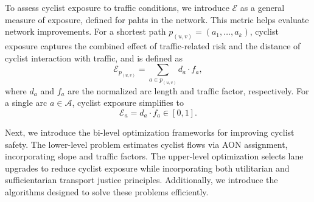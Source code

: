 \documentclass[letterpaper, 10 pt, conference]{ieeeconf}  %
\newcommand{\CRD}{$\text{C}_{\text{R}} \text{D }$}
\begin{document}
To assess cyclist exposure to traffic conditions, we introduce $\mathcal{E}$ as a general measure of exposure, defined for pahts in the network. This metric helps evaluate network improvements. For a shortest path $p_{(u,v)} = (a_1, \dots, a_k)$, cyclist exposure captures the combined effect of traffic-related risk and the distance of cyclist interaction with traffic, and is defined as
\begin{equation}
\label{exposure_def}
    \mathcal{E}_{p_{(u,v)}} = \sum_{a \in p_{(u,v)}} d_{a} \cdot f_{a},
\end{equation}
where $d_{a}$ and $f_{a}$ are the normalized arc length and traffic factor, respectively. For a single arc $a \in \mathcal{A}$, cyclist exposure simplifies to
\begin{equation}
\label{arc_exposure}
    \mathcal{E}_{a} = d_{a} \cdot f_{a} \in  \left [ 0,1 \right ].
\end{equation}

Next, we introduce the bi-level optimization frameworks for improving cyclist safety. The lower-level problem estimates cyclist flows via AON assignment, incorporating slope and traffic factors. The upper-level optimization selects lane upgrades to reduce cyclist exposure while incorporating both utilitarian and sufficientarian transport justice principles. Additionally, we introduce the algorithms designed to solve these problems efficiently.



    
\end{document}
